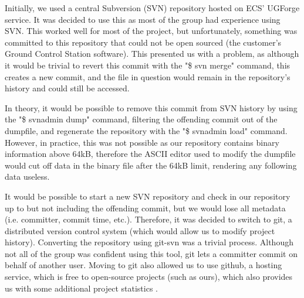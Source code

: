 Initially, we used a central Subversion (SVN) repository hosted on ECS' 
UGForge service. It was decided to use this as most of the group had 
experience using SVN. This worked well for most of the project, but 
unfortunately, something was committed to this repository that could not be 
open sourced (the customer's Ground Control Station software). This presented 
us with a problem, as although it would be trivial to revert this commit with 
the "\$ svn merge" command, this creates a new commit, and the file in 
question would remain in the repository's history and could still be accessed.

In theory, it would be possible to remove this commit from SVN history by 
using the "\$ svnadmin dump" command, filtering the offending commit out of 
the dumpfile, and regenerate the repository with the "\$ svnadmin load" 
command. However, in practice, this was not possible as our repository 
contains binary information above 64kB, therefore the ASCII editor used to 
modify the dumpfile would cut off data in the binary file after the 64kB 
limit, rendering any following data useless.

It would be possible to start a new SVN repository and check in our 
repository up to but not including the offending commit, but we would lose 
all metadata (i.e. committer, commit time, etc.). Therefore, it was decided to 
switch to git, a distributed version control system (which would allow us to 
modify project history). Converting the repository using git-svn was a trivial 
process. Although not all of the group was confident using this tool, git 
lets a committer commit on behalf of another user. Moving to git also 
allowed us to use github, a hosting service, which is free to open-source 
projects (such as ours), which also provides us with some additional 
project statistics \cite{github}.
